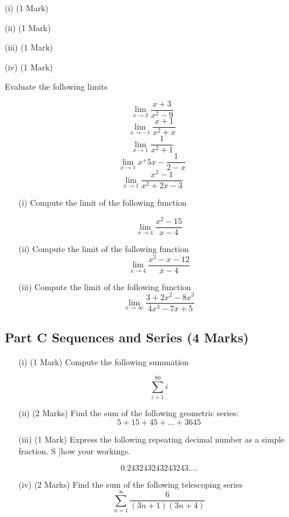 \documentclass[11pt]{article} %
\begin{document}

\item[(i)](1 Mark)

\item[(ii)](1 Mark)

\item[(iii)](1 Mark)

\item[(iv)](1 Mark)




Evaluate the following limits

\[  \lim_{x\to 3} \frac{x+3}{x^2-9}       \]
\[  \lim_{x\to -1} \frac{x+1}{x^2+x}      \]
\[  \lim_{x\to 1} \frac{1}{x^2+1}          \]
\[  \lim_{x\to 1} x^ + 5x - \frac{1}{2-x}   \]
\[  \lim_{x\to 1} \frac{x^2-1}{x^2+2x-3}    \]


\begin{enumerate}
	\item[(i)]  Compute the limit of the following function
	
	\[\lim_{x \to 4 } \frac{x^2-15}{x-4}\]
	\vspace{1.5cm}
	\item[(ii)]  Compute the limit of the following function
	\vspace{1.5cm}
	\[\lim_{x \to 4 } \frac{x^2-x-12}{x-4}\]
	\vspace{1.5cm}
	\item[(iii)]  Compute the limit of the following function
	\[ \lim_{x \to \infty } \frac{3 + 2x^2 - 8x^3 }{4x^3 - 7x + 5} \]	
	
\end{enumerate}
\newpage
\subsection*{Part C Sequences and Series (4 Marks)}

\begin{enumerate}
	\item[(i)](1 Mark)  Compute the following summation
	
	\[ \sum_{i=1}^{80} i \]

	\vspace{5.5cm}
	\item[(ii)] (2 Marks) Find the sum of the following geometric series: 
		\[5 + 15 + 45 +  \ldots + 3645\]
		\newpage

	
	\item[(iii)] (1 Mark) Express the following repeating decimal number as a simple fraction. S
	]how your workings.
	
	\[0.243243243243243....\]
	\vspace{5.5cm}
	\item[(iv)] (2 Marks) Find the sum of the following telescoping series
		\[  \sum^{\infty}_{n=1}   \frac{6}{(3n+1)(3n+4)}  \]
		
\end{enumerate}
\end{document}
